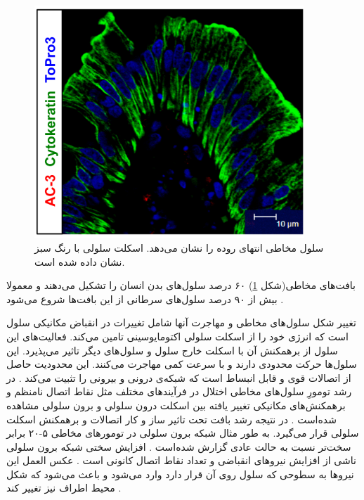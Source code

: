 \begin{figure}[htbp]
\begin{center}
\includegraphics[width=4in]{Figs/Epithelial}
\caption{
سلول مخاطی انتهای روده را نشان می‌دهد. اسکلت سلولی با رنگ سبز نشان داده شده است.\cite{10.1371/journal.pone.0030247}
}
\label{fig:Epithelial}
\end{center}
\end{figure}
بافت‌های مخاطی(شکل \ref{fig:Epithelial}) ۶۰ درصد سلول‌های بدن انسان را تشکیل می‌دهند و معمولا بیش از ۹۰ درصد سلول‌های سرطانی از این بافت‌ها شروع می‌شود \cite{doi:10.1080/19336918.2015.1008329}.

تغییر شکل سلول‌های مخاطی و مهاجرت آنها شامل تغییرات در انقباض مکانیکی سلول است که انرژی خود را از اسکلت سلولی اکتومایوسینی تامین می‌کند. فعالیت‌های این سلول از برهمکنش‌ آن با اسکلت خارج سلول و  سلول‌های دیگر تاثیر می‌پذیرد. این سلول‌ها حرکت محدودی دارند و با سرعت کمی مهاجرت می‌کنند. این محدودیت حاصل از اتصالات قوی و قابل انبساط است که شبکه‌ی درونی و بیرونی را تثبیت می‌کند \cite{LANGE20132418}. در رشد تومورِ سلول‌های مخاطی اختلال در فرآیندهای مختلف مثل نقاط اتصال نامنظم و برهمکنش‌های مکانیکی تغییر یافته بین اسکلت درون سلولی و برون سلولی مشاهده شده‌است \cite{LANGE20132418}. در نتیجه رشد بافت تحت تاثیر ساز و کار اتصالات و برهمکنش اسکلت سلولی قرار می‌گیرد. به طور مثال شبکه برون سلولی در تومورهای مخاطی ۵-۲۰ برابر سخت‌تر نسبت به حالت عادی گزارش شده‌است \cite{Paszek:2005qq}. افزایش سختی شبکه برون سلولی ناشی از افزایش نیروهای انقباضی و تعداد نقاط اتصال کانونی است \cite{LANGE20132418}. عکس العمل این نیرو‌ها به سطوحی که سلول روی آن قرار دارد وارد می‌شود و باعث می‌شود که شکل محیط اطراف نیز تغییر کند \cite{PhysRevB.14.3438}.



